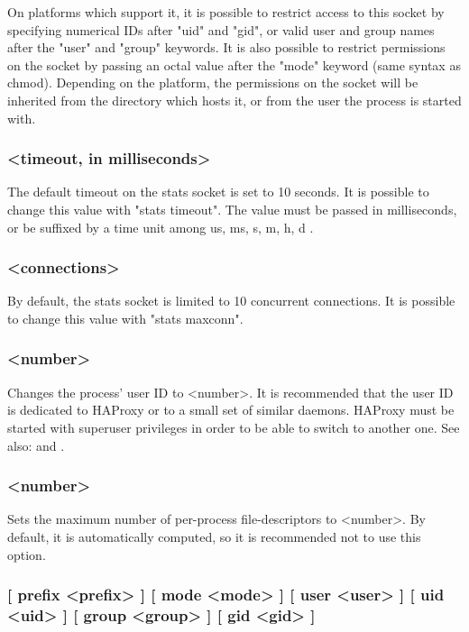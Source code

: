 On platforms which support it, it is possible to restrict access to this
socket by specifying numerical IDs after "uid" and "gid", or valid user and
group names after the "user" and "group" keywords. It is also possible to
restrict permissions on the socket by passing an octal value after the "mode"
keyword (same syntax as chmod). Depending on the platform, the permissions on
the socket will be inherited from the directory which hosts it, or from the
user the process is started with.

\subsubsection[stats timeout]{ <timeout, in milliseconds>}

The default timeout on the stats socket is set to 10 seconds. It is possible
to change this value with "stats timeout". The value must be passed in
milliseconds, or be suffixed by a time unit among { us, ms, s, m, h, d }.

\subsubsection[stats maxconn]{ <connections>}

By default, the stats socket is limited to 10 concurrent connections. It is
possible to change this value with "stats maxconn".

\subsubsection[uid]{ <number>}

Changes the process' user ID to <number>. It is recommended that the user ID
is dedicated to HAProxy or to a small set of similar daemons. HAProxy must
be started with superuser privileges in order to be able to switch to another
one.
See also:  and .

\subsubsection[ulimit-n]{ <number>}

Sets the maximum number of per-process file-descriptors to <number>. By
default, it is automatically computed, so it is recommended not to use this
option.

\subsubsection[unix-bind]{ [ prefix <prefix> ] [ mode <mode> ] 
[ user <user> ] [ uid <uid> ] [ group <group> ] [ gid <gid> ]}

